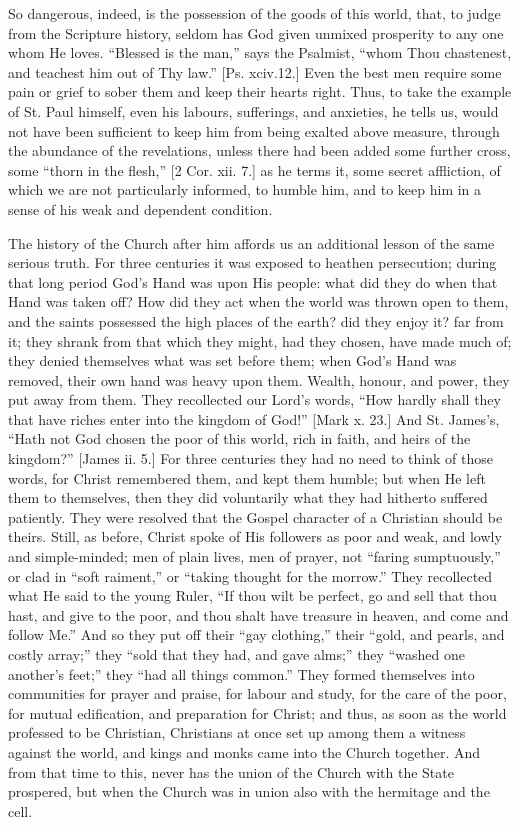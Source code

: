 So dangerous, indeed, is the possession of the goods of this world,
that, to judge from the Scripture history, seldom has God given
unmixed prosperity to any one whom He loves. ``Blessed is the
man,'' says the Psalmist, ``whom Thou chastenest, and teachest
him out of Thy law.'' [Ps. xciv.12.] Even the best men require
some pain or grief to sober them and keep their hearts right. Thus, to
take the example of St. Paul himself, even his labours, sufferings,
and anxieties, he tells us, would not have been sufficient to keep him
from being exalted above measure, through the abundance of the
revelations, unless there had been added some further cross, some
``thorn in the flesh,'' [2 Cor. xii. 7.] as he terms it, some
secret affliction, of which we are not particularly informed, to
humble him, and to keep him in a sense of his weak and dependent
condition.

The history of the Church after him affords us an additional lesson
of the same serious truth. For three centuries it was exposed to
heathen persecution; during that long period God's Hand was upon His
people: what did they do when that Hand was taken off? How did they
act when the world was thrown open to them, and the saints possessed
the high places of the earth? did they enjoy it? far from it; they
shrank from that which they might, had they chosen, have made much of;
they denied themselves what was set before them; when God's Hand was
removed, their own hand was heavy upon them. Wealth, honour, and
power, they put away from them. They recollected our Lord's words,
``How hardly shall they that have riches enter into the kingdom of
God!'' [Mark x. 23.] And St. James's, ``Hath not God chosen
the poor of this world, rich in faith, and heirs of the kingdom?''
[James ii. 5.] For three centuries they had no need to think of those
words, for Christ remembered them, and kept them humble; but when He
left them to themselves, then they did voluntarily what they had
hitherto suffered patiently. They were resolved that the Gospel
character of a Christian should be theirs. Still, as before, Christ
spoke of His followers as poor and weak, and lowly and simple-minded;
men of plain lives, men of prayer, not ``faring sumptuously,''
or clad in ``soft raiment,'' or ``taking thought for the
morrow.'' They recollected what He said to the young Ruler,
``If thou wilt be perfect, go and sell that thou hast, and give to
the poor, and thou shalt have treasure in heaven, and come and follow
Me.'' And so they put off their ``gay clothing,'' their
``gold, and pearls, and costly array;'' they ``sold that
they had, and gave alms;'' they ``washed one another's
feet;'' they ``had all things common.'' They formed
themselves into communities for prayer and praise, for labour and
study, for the care of the poor, for mutual edification, and
preparation for Christ; and thus, as soon as the world professed to be
Christian, Christians at once set up among them a witness against the
world, and kings and monks came into the Church together. And from
that time to this, never has the union of the Church with the State
prospered, but when the Church was in union also with the hermitage
and the cell.

